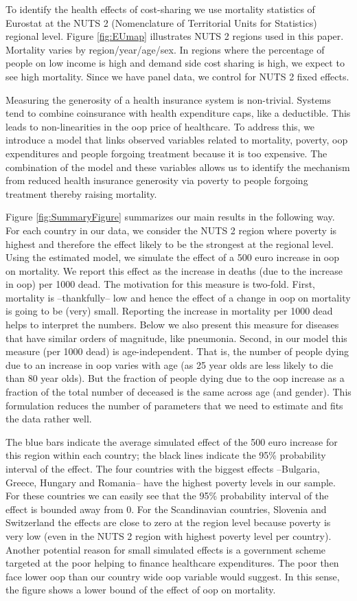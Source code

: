 \documentclass[a4paper,12pt]{article}
\begin{document}
To identify the health effects of cost-sharing we use mortality statistics of Eurostat at the NUTS 2 (Nomenclature of Territorial Units for Statistics) regional level. Figure \ref{fig:EUmap} illustrates NUTS 2 regions used in this paper. Mortality varies by region/year/age/sex. In regions where the percentage of people on low income is high and demand side cost sharing is high, we expect to see high mortality. Since we have panel data, we control for NUTS 2 fixed effects.

Measuring the generosity of a health insurance system is non-trivial. Systems tend to combine coinsurance with health expenditure caps, like a deductible. This leads to non-linearities in the oop price of healthcare. To address this, we introduce a model that links observed variables related to mortality, poverty, oop expenditures and people forgoing treatment because it is too expensive. The combination of the model and these variables allows us to identify the mechanism from reduced health insurance generosity via poverty to people forgoing treatment thereby raising mortality.

Figure \ref{fig:SummaryFigure} summarizes our main results in the following way. For each country in our data, we consider the NUTS 2 region where poverty is highest and therefore the effect likely to be the strongest at the regional level. Using the estimated model, we simulate the effect of a 500 euro increase in oop on mortality. We report this effect as the increase in deaths (due to the increase in oop) per 1000 dead. The motivation for this measure is two-fold. First, mortality is --thankfully-- low and hence the effect of a change in oop on mortality is going to be (very) small. Reporting the increase in mortality per 1000 dead helps to interpret the numbers. Below we also present this measure for diseases that have similar orders of magnitude, like pneumonia. Second, in our model this measure (per 1000 dead) is age-independent. That is, the number of people dying due to an increase in oop varies with age (as 25 year olds are less likely to die than 80 year olds). But the fraction of people dying due to the oop increase as a fraction of the total number of deceased is the same across age (and gender). This formulation reduces the number of parameters that we need to estimate and fits the data rather well. 

The blue bars indicate the average simulated effect of the 500 euro increase for this region within each country; the black lines indicate the 95\% probability interval of the effect. The four countries with the biggest effects --Bulgaria, Greece, Hungary and Romania-- have the highest poverty levels in our sample. For these countries we can easily see that the 95\% probability interval of the effect is bounded away from 0. For the Scandinavian countries, Slovenia and Switzerland the effects are close to zero at the region level because poverty is very low (even in the NUTS 2 region with highest poverty level per country). Another potential reason for small simulated effects is a government scheme targeted at the poor helping to finance healthcare expenditures. The poor then face lower oop than our country wide oop variable would suggest. In this sense, the figure shows a lower bound of the effect of oop on mortality. 
\end{document}
